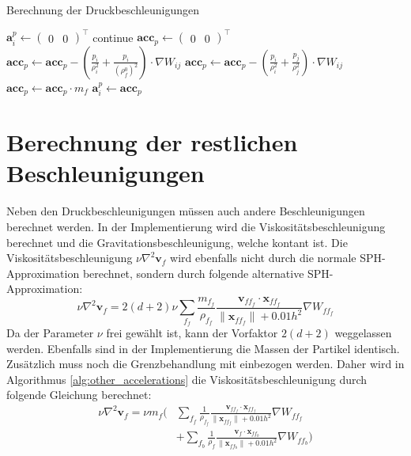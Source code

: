 \documentclass{scrreprt}
\begin{document}
\begin{algorithm}
    \caption{Berechnung der Druckbeschleunigungen}
    \label{alg:pressure_acceleration}
    \begin{algorithmic}
            \State $\textbf{a}_i^p \gets \begin{pmatrix}0 & 0 \end{pmatrix}^\intercal$
            \State continue
        \EndIf
        \State $\textbf{acc}_p \gets \begin{pmatrix}0 & 0 \end{pmatrix}^\intercal$
        \State
        \State {}
                \State $\textbf{acc}_p \gets \textbf{acc}_p - \left(\frac{p_i}{\rho_i^2} + \frac{p_i}{\left(\rho_f^0\right)^2}\right) \cdot \nabla W_{ij}$ 
            \Else
                \State $\textbf{acc}_p \gets \textbf{acc}_p - \left(\frac{p_i}{\rho_i^2} + \frac{p_j}{\rho_j^2}\right) \cdot \nabla W_{ij}$
            \EndIf
        \EndFor
        \State $\textbf{acc}_p \gets \textbf{acc}_p \cdot m_f$
        \State
        \State $\textbf{a}_i^p \gets \textbf{acc}_p$
    \EndFor
    \end{algorithmic}
\end{algorithm}


\section{Berechnung der restlichen Beschleunigungen}
Neben den Druckbeschleunigungen müssen auch andere Beschleunigungen berechnet werden.
In der Implementierung wird die Viskositätsbeschleunigung berechnet und die Gravitationsbeschleunigung, welche kontant ist.
Die Viskositätsbeschleunigung $\nu \nabla^2 \textbf{v}_f$ wird ebenfalls nicht durch die normale SPH-Approximation berechnet,
sondern durch folgende alternative SPH-Approximation:
\begin{equation}
    \nu \nabla^2 \textbf{v}_f = 2(d + 2) \nu \sum_{f_f} \frac{m_{f_f}}{\rho_{f_f}} \frac{\textbf{v}_{ff_f} \cdot \textbf{x}_{ff_f}}{\|\textbf{x}_{ff_f}\| + 
    0.01h^2} \nabla W_{ff_f}
\end{equation}
Da der Parameter $\nu$ frei gewählt ist, kann der Vorfaktor $2(d+2)$ weggelassen werden.
Ebenfalls sind in der Implementierung die Massen der Partikel identisch.
Zusätzlich muss noch die Grenzbehandlung mit einbezogen werden.
Daher wird in Algorithmus \ref{alg:other_accelerations} die Viskositätsbeschleunigung
durch folgende Gleichung berechnet:
\begin{align}
    \nu \nabla^2 \textbf{v}_f = \nu m_f \biggl(&\sum_{f_f} \frac{1}{\rho_{f_f}} \frac{\textbf{v}_{ff_f} \cdot \textbf{x}_{ff_f}}{\|\textbf{x}_{ff_f}\| + 
    0.01h^2} \nabla W_{ff_f}\\
    &+ \sum_{f_b} \frac{1}{\rho_f} \frac{\textbf{v}_f \cdot \textbf{x}_{ff_b}}{\|\textbf{x}_{ff_b}\| + 
    0.01h^2} \nabla W_{ff_b}
    \biggr)
\end{align}
\end{document}
